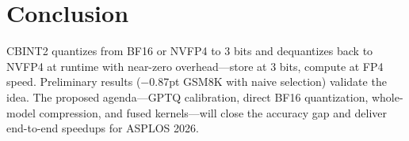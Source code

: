 \documentclass[11pt,a4paper]{article}
\begin{document}
\section{Conclusion}

\begin{sloppypar}
CBINT2 quantizes from BF16 or NVFP4 to 3 bits and dequantizes back to NVFP4 at runtime with near-zero overhead---store at 3 bits, compute at FP4 speed.
Preliminary results ($-$0.87pt GSM8K with naive selection) validate the idea.
The proposed agenda---GPTQ calibration, direct BF16 quantization, whole-model compression, and fused kernels---will close the accuracy gap and deliver end-to-end speedups for ASPLOS 2026.
\end{sloppypar}
\end{document}
